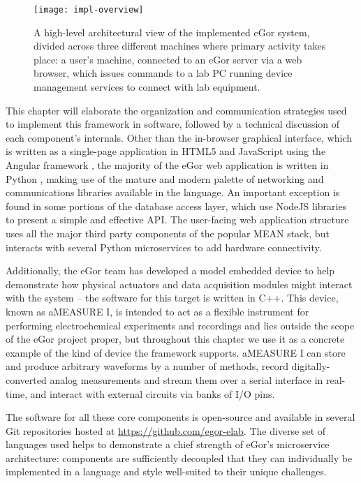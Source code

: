 \documentclass[../thesis]{subfiles}
\begin{document}
\begin{figure}
  \texttt{[image: impl-overview]}
  \caption{
    A high-level architectural view of the implemented eGor system,
    divided across three different machines where primary activity
    takes place: a user's machine, connected to an eGor server via a
    web browser, which issues commands to a lab PC running device
    management services to connect with lab equipment.
    \label{fig:ImplOverview}
  }
\end{figure}

This chapter will elaborate the organization and communication
strategies used to implement this framework in software, followed by a
technical discussion of each component's internals.  Other than the
in-browser graphical interface, which is written as a single-page
application in HTML5 and JavaScript using the Angular framework
\cite{Angular}, the majority of the eGor web application is written in
Python \cite{Python}, making use of the mature and modern palette of
networking and communications libraries available in the language. An
important exception is found in some portions of the database access
layer, which use NodeJS \cite{NodeJS} libraries to present a simple
and effective API. The user-facing web application structure uses all
the major third party components of the popular \gls{MEAN} stack, but
interacts with several Python microservices to add hardware
connectivity.

Additionally, the eGor team has developed a model
embedded device to help demonstrate how physical actuators and data
acquisition modules might interact with the system -- the software for
this target is written in C++. This device, known as aMEASURE I, is intended to
act as a flexible instrument for performing electrochemical
experiments and recordings and lies outside the scope of the eGor project
proper, but throughout this chapter we use it as a concrete example of
the kind of device the framework supports. aMEASURE I can store and
produce arbitrary waveforms by a number of methods, record
digitally-converted analog measurements and stream them over a serial
interface in real-time, and interact with external circuits via banks
of I/O pins.

The software for all these core
components is open-source and available in several Git repositories
hosted at \url{https://github.com/egor-elab}. The diverse set of
languages used helps to demonstrate a chief strength of eGor's
microservice architecture: components are sufficiently decoupled that
they can individually be implemented in a language and style
well-suited to their unique challenges.
\end{document}
